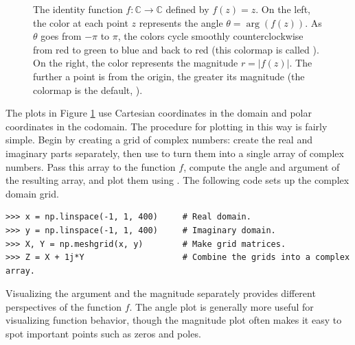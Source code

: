 \begin{figure}[H]
\begin{subfigure}{.49\textwidth}
\end{subfigure}
\caption{The identity function $f: \mathbb{C} \rightarrow \mathbb{C}$ defined by $f(z)=z$. On the left, the color at each point $z$ represents the angle $\theta = \arg(f(z))$. As $\theta$ goes from $-\pi$ to $\pi$, the colors cycle smoothly counterclockwise from red to green to blue and back to red (this colormap is called ). On the right, the color represents the magnitude $r = |f(z)|$. The further a point is from the origin, the greater its magnitude (the colormap is the default, ).
}
\label{fig:complex-identity-angle-mag}
\end{figure}

The plots in Figure \ref{fig:complex-identity-angle-mag} use Cartesian coordinates in the domain and polar coordinates in the codomain.
The procedure for plotting in this way is fairly simple.
Begin by creating a grid of complex numbers: create the real and imaginary parts separately, then use  to turn them into a single array of complex numbers.
Pass this array to the function $f$, compute the angle and argument of the resulting array, and plot them using .
The following code sets up the complex domain grid.

\begin{lstlisting}
>>> x = np.linspace(-1, 1, 400)     # Real domain.
>>> y = np.linspace(-1, 1, 400)     # Imaginary domain.
>>> X, Y = np.meshgrid(x, y)        # Make grid matrices.
>>> Z = X + 1j*Y                    # Combine the grids into a complex array.
\end{lstlisting}

Visualizing the argument and the magnitude separately provides different perspectives of the function $f$.
The angle plot is generally more useful for visualizing function behavior, though the magnitude plot often makes it easy to spot important points such as zeros and poles.

